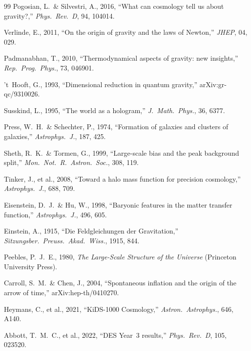\documentclass[11pt]{article}
\begin{document}
\begin{thebibliography}{99}
Pogosian, L.\ \& Silvestri, A., 2016, ``What can cosmology tell us about
gravity?,'' \textit{Phys.\ Rev.\ D}, 94, 104014.

Verlinde, E., 2011, ``On the origin of gravity and the laws of Newton,''
\textit{JHEP}, 04, 029.

Padmanabhan, T., 2010, ``Thermodynamical aspects of gravity: new insights,''
\textit{Rep.\ Prog.\ Phys.}, 73, 046901.

't~Hooft, G., 1993, ``Dimensional reduction in quantum gravity,''
arXiv:gr-qc/9310026.

Susskind, L., 1995, ``The world as a hologram,'' \textit{J.\ Math.\ Phys.},
36, 6377.

Press, W.~H.\ \& Schechter, P., 1974, ``Formation of galaxies and clusters
of galaxies,'' \textit{Astrophys.\ J.}, 187, 425.

Sheth, R.~K.\ \& Tormen, G., 1999, ``Large-scale bias and the peak
background split,'' \textit{Mon.\ Not.\ R.\ Astron.\ Soc.}, 308, 119.

Tinker, J., et al., 2008, ``Toward a halo mass function for precision
cosmology,'' \textit{Astrophys.\ J.}, 688, 709.

Eisenstein, D.~J.\ \& Hu, W., 1998, ``Baryonic features in the matter
transfer function,'' \textit{Astrophys.\ J.}, 496, 605.

Einstein, A., 1915, ``Die Feldgleichungen der Gravitation,''
\textit{Sitzungsber.\ Preuss.\ Akad.\ Wiss.}, 1915, 844.

Peebles, P.~J.~E., 1980, \textit{The Large-Scale Structure of the Universe}
(Princeton University Press).

Carroll, S.~M.\ \& Chen, J., 2004, ``Spontaneous inflation and the origin
of the arrow of time,'' arXiv:hep-th/0410270.

Heymans, C., et al., 2021, ``KiDS-1000 Cosmology,'' \textit{Astron.\
Astrophys.}, 646, A140.

Abbott, T.~M.~C., et al., 2022, ``DES Year~3 results,'' \textit{Phys.\
Rev.\ D}, 105, 023520.


\end{thebibliography}
\end{document}
